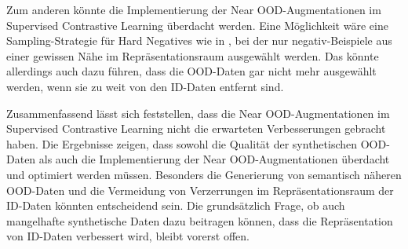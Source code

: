 Zum anderen könnte die Implementierung der Near OOD-Augmentationen im Supervised Contrastive Learning überdacht werden. Eine Möglichkeit wäre eine Sampling-Strategie für Hard Negatives wie in \parencite{Jiang2024supconhardnegatives}, bei der nur negativ-Beispiele aus einer gewissen Nähe im Repräsentationsraum ausgewählt werden. Das könnte allerdings auch dazu führen, dass die OOD-Daten gar nicht mehr ausgewählt werden, wenn sie zu weit von den ID-Daten entfernt sind.

Zusammenfassend lässt sich feststellen, dass die Near OOD-Augmentationen im Supervised Contrastive Learning nicht die erwarteten Verbesserungen gebracht haben. Die Ergebnisse zeigen, dass sowohl die Qualität der synthetischen OOD-Daten als auch die Implementierung der Near OOD-Augmentationen überdacht und optimiert werden müssen. Besonders die Generierung von semantisch näheren OOD-Daten und die Vermeidung von Verzerrungen im Repräsentationsraum der ID-Daten könnten entscheidend sein. Die grundsätzlich Frage, ob auch mangelhafte synthetische Daten dazu beitragen können, dass die Repräsentation von ID-Daten verbessert wird, bleibt vorerst offen.